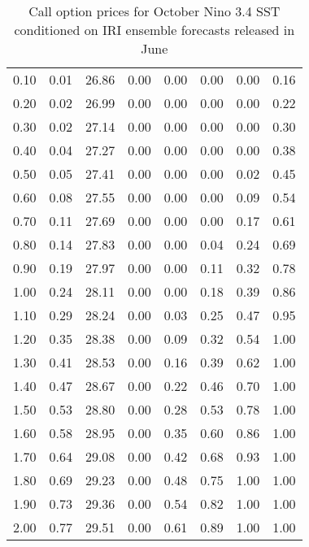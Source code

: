\begin{table*}[ht]
\begin{tabular}{rrrrrrrr}
  0.10 & 0.01 & 26.86 & 0.00 & 0.00 & 0.00 & 0.00 & 0.16 \\ 
  0.20 & 0.02 & 26.99 & 0.00 & 0.00 & 0.00 & 0.00 & 0.22 \\ 
  0.30 & 0.02 & 27.14 & 0.00 & 0.00 & 0.00 & 0.00 & 0.30 \\ 
  0.40 & 0.04 & 27.27 & 0.00 & 0.00 & 0.00 & 0.00 & 0.38 \\ 
  0.50 & 0.05 & 27.41 & 0.00 & 0.00 & 0.00 & 0.02 & 0.45 \\ 
  0.60 & 0.08 & 27.55 & 0.00 & 0.00 & 0.00 & 0.09 & 0.54 \\ 
  0.70 & 0.11 & 27.69 & 0.00 & 0.00 & 0.00 & 0.17 & 0.61 \\ 
  0.80 & 0.14 & 27.83 & 0.00 & 0.00 & 0.04 & 0.24 & 0.69 \\ 
  0.90 & 0.19 & 27.97 & 0.00 & 0.00 & 0.11 & 0.32 & 0.78 \\ 
  1.00 & 0.24 & 28.11 & 0.00 & 0.00 & 0.18 & 0.39 & 0.86 \\ 
  1.10 & 0.29 & 28.24 & 0.00 & 0.03 & 0.25 & 0.47 & 0.95 \\ 
  1.20 & 0.35 & 28.38 & 0.00 & 0.09 & 0.32 & 0.54 & 1.00 \\ 
  1.30 & 0.41 & 28.53 & 0.00 & 0.16 & 0.39 & 0.62 & 1.00 \\ 
  1.40 & 0.47 & 28.67 & 0.00 & 0.22 & 0.46 & 0.70 & 1.00 \\ 
  1.50 & 0.53 & 28.80 & 0.00 & 0.28 & 0.53 & 0.78 & 1.00 \\ 
  1.60 & 0.58 & 28.95 & 0.00 & 0.35 & 0.60 & 0.86 & 1.00 \\ 
  1.70 & 0.64 & 29.08 & 0.00 & 0.42 & 0.68 & 0.93 & 1.00 \\ 
  1.80 & 0.69 & 29.23 & 0.00 & 0.48 & 0.75 & 1.00 & 1.00 \\ 
  1.90 & 0.73 & 29.36 & 0.00 & 0.54 & 0.82 & 1.00 & 1.00 \\ 
  2.00 & 0.77 & 29.51 & 0.00 & 0.61 & 0.89 & 1.00 & 1.00 \\ 
   \hline
\end{tabular}
\caption{Call option prices for October Nino 3.4 SST conditioned on IRI ensemble forecasts released in June} 
\end{table*}

